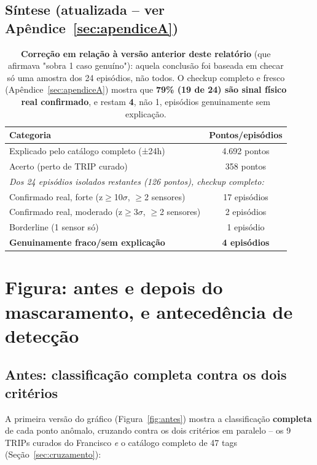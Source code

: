 \documentclass[11pt,a4paper]{article}
\begin{document}
\subsection{Síntese (atualizada -- ver Apêndice~\ref{sec:apendiceA})}

\begin{table}[H]
\centering
\begin{tabular}{lc}
\toprule
\textbf{Categoria} & \textbf{Pontos/episódios} \\
\midrule
Explicado pelo catálogo completo (±24h) & 4.692 pontos \\
Acerto (perto de TRIP curado) & 358 pontos \\
\midrule
\multicolumn{2}{l}{\textit{Dos 24 episódios isolados restantes (126 pontos), checkup completo:}} \\
Confirmado real, forte (z$\geq$10$\sigma$, $\geq$2 sensores) & 17 episódios \\
Confirmado real, moderado (z$\geq$3$\sigma$, $\geq$2 sensores) & 2 episódios \\
Borderline (1 sensor só) & 1 episódio \\
\textbf{Genuinamente fraco/sem explicação} & \textbf{4 episódios} \\
\bottomrule
\end{tabular}
\caption{\textbf{Correção em relação à versão anterior deste relatório}
(que afirmava "sobra 1 caso genuíno"): aquela conclusão foi baseada em
checar só uma amostra dos 24 episódios, não todos. O checkup completo
e fresco (Apêndice~\ref{sec:apendiceA}) mostra que \textbf{79\% (19 de
24) são sinal físico real confirmado}, e restam \textbf{4}, não 1,
episódios genuinamente sem explicação.}
\end{table}

\section{Figura: antes e depois do mascaramento, e antecedência de detecção}
\label{sec:figura}

\subsection{Antes: classificação completa contra os dois critérios}
\label{sec:figura-antes}

A primeira versão do gráfico (Figura~\ref{fig:antes}) mostra a
classificação \textbf{completa} de cada ponto anômalo, cruzando contra
os dois critérios em paralelo -- os 9 TRIPs curados do Francisco
\emph{e} o catálogo completo de 47 tags (Seção~\ref{sec:cruzamento}):
\end{document}
